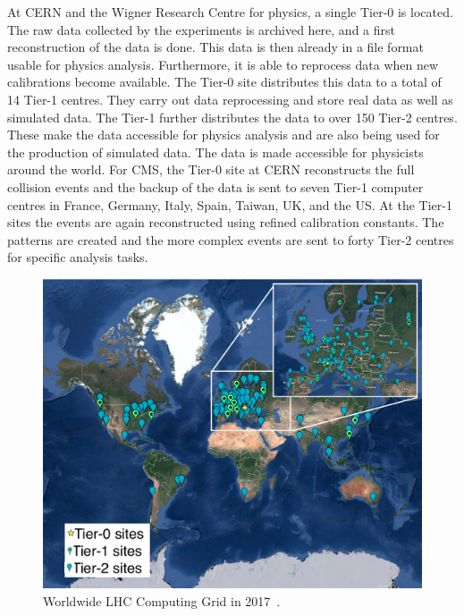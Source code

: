 At CERN and the Wigner Research Centre for physics, a single Tier-0 is located. The raw data collected by the experiments is archived here, and a first reconstruction of the data is done. This data is then already in a file format usable for physics analysis. Furthermore, it is able to reprocess data when new calibrations become available. The Tier-0 site distributes this data to a total of 14 Tier-1 centres. They carry out data reprocessing and store real data as well as simulated  data. The Tier-1 further distributes the data to over 150 Tier-2 centres. These make the data accessible for physics analysis and are also being used for the production of simulated data. The data is made accessible for  physicists around the world. For CMS, the Tier-0 site at CERN reconstructs the full collision events and the backup of the data is sent to seven Tier-1 computer centres in France, Germany, Italy, Spain, Taiwan, UK, and the US. At the Tier-1 sites the events are again reconstructed using refined calibration constants. The patterns are created and the more complex events are sent to forty Tier-2 centres for specific analysis tasks. 
\begin{figure}[htbp]
	\centering
	\includegraphics[width=1.\linewidth]{2_ExperimentalSetup/Figures/WLHCG}
	\caption{Worldwide LHC Computing Grid in 2017~\cite{WLCG}.}
	\label{fig:wlhcg}
\end{figure}
